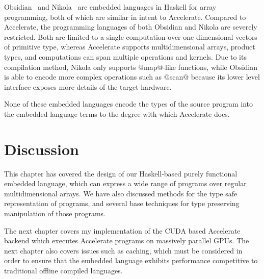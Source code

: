 Obsidian~\cite{Svensson:2008a} and Nikola~\cite{Mainland:2010vj} are embedded
languages in Haskell for array programming, both of which are similar in intent
to Accelerate. Compared to Accelerate, the programming languages of both
Obsidian and Nikola are severely restricted. Both are limited to a single
computation over one dimensional vectors of primitive type, whereas Accelerate
supports multidimensional arrays, product types, and computations can span
multiple operations and kernels. Due to its compilation method, Nikola only
supports @map@-like functions, while Obsidian is able to encode more complex
operations such as @scan@ because its lower level interface exposes more details
of the target hardware.

None of these embedded languages encode the types of the source program into the
embedded language terms to the degree with which Accelerate does.


\section{Discussion}

This chapter has covered the design of our Haskell-based purely functional
embedded language, which can express a wide range of programs over regular
multidimensional arrays. We have also discussed methods for the type safe
representation of programs, and several base techniques for type preserving
manipulation of those programs.

The next chapter covers my implementation of the CUDA based Accelerate backend
which executes Accelerate programs on massively parallel GPUs. The next chapter
also covers issues such as caching, which must be considered in order to ensure
that the embedded language exhibits performance competitive to traditional
offline compiled languages.


